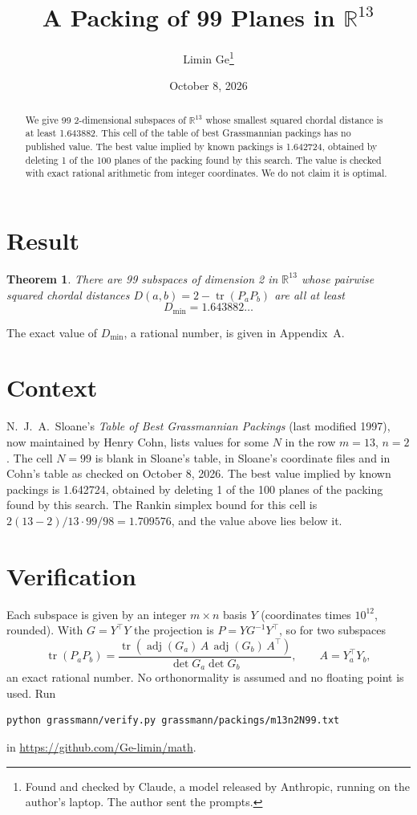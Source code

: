 \documentclass[11pt,a4paper]{article}
\title{A Packing of 99 Planes in $\mathbb{R}^{13}$}
\author{Limin Ge\thanks{Found and checked by Claude, a model released by Anthropic, running on the author's laptop. The author sent the prompts.}}
\date{October 8, 2026}
\newtheorem*{theorem}{Theorem}
\begin{document}
\maketitle
\begin{abstract}
We give 99 2-dimensional subspaces of $\mathbb{R}^{13}$ whose smallest squared chordal distance is at least 1.643882. This cell of the table of best Grassmannian packings has no published value. The best value implied by known packings is 1.642724, obtained by deleting 1 of the 100 planes of the packing found by this search. The value is checked with exact rational arithmetic from integer coordinates. We do not claim it is optimal.
\end{abstract}

\section{Result}
\begin{theorem}
There are 99 subspaces of dimension 2 in $\mathbb{R}^{13}$ whose pairwise squared chordal distances $D(a,b) = 2 - \operatorname{tr}(P_aP_b)$ are all at least
\[ D_{\min} = 1.643882\ldots \]
\end{theorem}
The exact value of $D_{\min}$, a rational number, is given in Appendix~A.


\section{Context}
N.~J.~A.~Sloane's \emph{Table of Best Grassmannian Packings} (last modified 1997), now maintained by Henry Cohn, lists values for some $N$ in the row $m=13$, $n=2$. The cell $N=99$ is blank in Sloane's table, in Sloane's coordinate files and in Cohn's table as checked on October 8, 2026. The best value implied by known packings is 1.642724, obtained by deleting 1 of the 100 planes of the packing found by this search. The Rankin simplex bound for this cell is $2(13-2)/13\cdot 99/98 = 1.709576$, and the value above lies below it.


\section{Verification}
Each subspace is given by an integer $m\times n$ basis $Y$ (coordinates times $10^{12}$, rounded). With $G=Y^\top Y$ the projection is $P=YG^{-1}Y^\top$, so for two subspaces
\[ \operatorname{tr}(P_aP_b)=\frac{\operatorname{tr}(\operatorname{adj}(G_a)\,A\,\operatorname{adj}(G_b)\,A^\top)}{\det G_a\det G_b},\qquad A=Y_a^\top Y_b, \]
an exact rational number. No orthonormality is assumed and no floating point is used. Run
\begin{verbatim}
python grassmann/verify.py grassmann/packings/m13n2N99.txt
\end{verbatim}
in \url{https://github.com/Ge-limin/math}.
\end{document}
